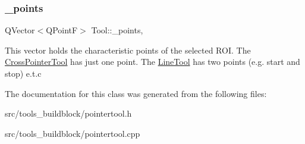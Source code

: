 \subsubsection{\texorpdfstring{\+\_\+points}{\_points}}
{\footnotesize\ttfamily Q\+Vector$<$Q\+PointF$>$ Tool\+::\+\_\+points\hspace{0.3cm}{\ttfamily [protected]}, {\ttfamily [inherited]}}

This vector holds the characteristic points of the selected R\+OI. The \mbox{\hyperlink{classCrossPointerTool}{Cross\+Pointer\+Tool}} has just one point. The \mbox{\hyperlink{classLineTool}{Line\+Tool}} has two points (e.\+g. start and stop) e.\+t.\+c 

The documentation for this class was generated from the following files\+:\begin{DoxyCompactItemize}
\item 
src/tools\+\_\+buildblock/pointertool.\+h\item 
src/tools\+\_\+buildblock/pointertool.\+cpp\end{DoxyCompactItemize}
